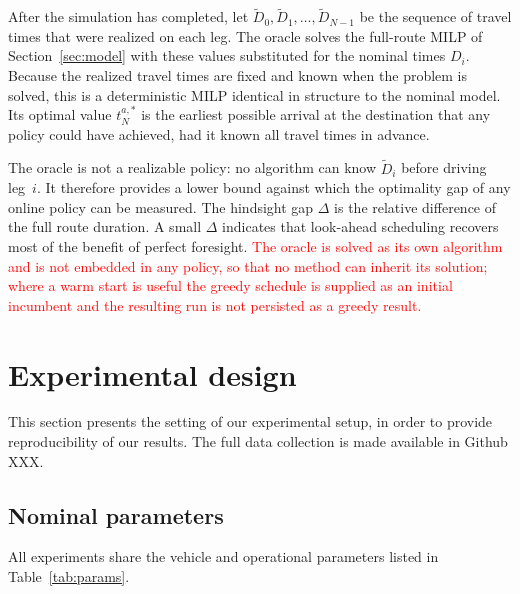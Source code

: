 \documentclass[preprint,12pt,3p]{elsarticle}
\newcommand{\red}[1]{\textcolor{red}{#1}}
\begin{document}
After the simulation has completed, let $\tilde{D}_0, \tilde{D}_1, \ldots, \tilde{D}_{N-1}$ be the sequence of travel times that were realized on each leg. The oracle solves the full-route MILP of Section~\ref{sec:model} with these values substituted for the nominal times $D_i$. Because the realized travel times are fixed and known when the problem is solved, this is a deterministic MILP identical in structure to the nominal model. Its optimal value $t^{a,*}_N$ is the earliest possible arrival at the destination that any policy could have achieved, had it known all travel times in advance.

The oracle is not a realizable policy: no algorithm can know $\tilde{D}_i$ before driving leg~$i$. It therefore provides a lower bound against which the optimality gap of any online policy can be measured.  The hindsight gap $\Delta$ is the relative difference of the full route duration. A small $\Delta$ indicates that look-ahead scheduling recovers most of the benefit of perfect foresight. \red{The oracle is solved as its own algorithm and is not embedded in any policy, so that no method can inherit its solution; where a warm start is useful the greedy schedule is supplied as an initial incumbent and the resulting run is not persisted as a greedy result.}


\section{Experimental design} \label{sec:exp}
This section presents the setting of our experimental setup, in order to provide reproducibility of our results. The full data collection is made available in Github XXX.

\subsection{Nominal parameters}
All experiments share the vehicle and operational parameters listed in Table~\ref{tab:params}.
\end{document}
